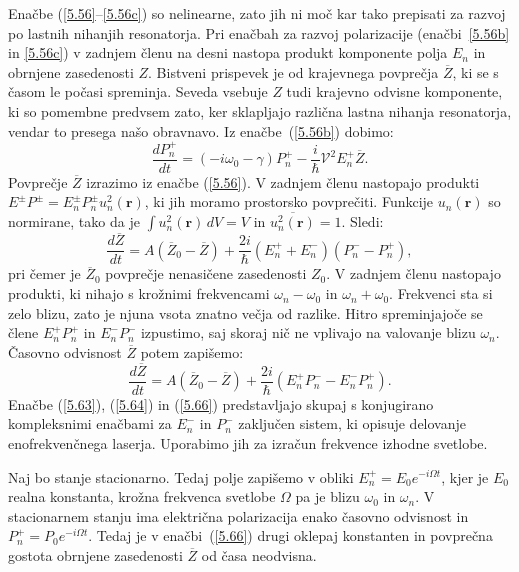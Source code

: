 Enačbe (\ref{5.56}--\ref{5.56c}) so nelinearne, zato jih ni moč kar tako
prepisati za razvoj po lastnih nihanjih resonatorja. Pri enačbah za
razvoj polarizacije (enačbi~\ref{5.56b} in \ref{5.56c}) v zadnjem členu na desni 
nastopa produkt komponente polja $E_n$ in obrnjene zasedenosti $Z$. Bistveni
prispevek je od krajevnega povprečja $\overline{Z}$, ki se s časom le počasi spreminja.
Seveda vsebuje $Z$ tudi krajevno odvisne komponente, ki so pomembne 
predvsem zato, ker sklapljajo različna lastna nihanja resonatorja, vendar to
presega našo obravnavo. Iz enačbe~(\ref{5.56b}) dobimo:
\begin{equation}  
\label{5.64}
\frac{d P_n^+}{dt}=\left(-i \omega_0-\gamma\right)P_n^{+}-\frac{i}{\hslash}
\mathcal{V}^2 E_n^+ \overline{Z}.
\end{equation}
Povprečje $\overline{Z}$ izrazimo iz enačbe (\ref{5.56}). V zadnjem členu nastopajo produkti 
$E^{\pm}P^{\pm}=E_n^{\pm}P_n^{\pm} u_n^2\left(\mathbf{r}\right)$,
ki jih moramo prostorsko povprečiti. Funkcije $u_n\left(\mathbf{r}\right)$ so
normirane, tako da je $\int u_n^2\left(\mathbf{r}\right) \,dV=V$ in $\overline{u_n^2\left(\mathbf{r}\right)}=1$.
Sledi:
\begin{equation}  
\label{5.65}
\frac{d\overline{Z}}{dt}= A\left(\overline{Z}_0-\overline{Z}\right)+ \frac{2i}{\hslash}\left(E_n^+
+E_n^-\right)\left(P_n^- - P_n^+\right)\!\!,
\end{equation}
pri čemer je $\overline{Z}_0$ povprečje nenasičene zasedenosti $Z_0$. V zadnjem
členu nastopajo produkti, ki nihajo s krožnimi frekvencami $\omega_n-
\omega_0$ in $\omega_n+ \omega_0$. Frekvenci sta si zelo blizu,
zato je njuna vsota znatno večja od razlike. Hitro spreminjajoče se člene 
$E_n^+P_n^+$ in $E_n^- P_n^-$ izpustimo, 
saj skoraj nič ne vplivajo na valovanje blizu $\omega_n$. Časovno odvisnost 
$\overline{Z}$ potem zapišemo:  
\begin{equation}  
\label{5.66}
\frac{d\overline{Z}}{dt}= A\left(\overline{Z}_0-\overline{Z}\right)+\frac{2i}{\hslash}\left(E_n^+
P_n^- - E_n^- P_n^+\right)\!\!.
\end{equation}
Enačbe (\ref{5.63}), (\ref{5.64}) in (\ref{5.66}) predstavljajo skupaj s konjugirano
kompleksnimi enačbami za $E_n^-$ in $P_n^-$ zaključen
sistem, ki opisuje delovanje enofrekvenčnega laserja. Uporabimo jih za
izračun frekvence izhodne svetlobe.

Naj bo stanje stacionarno. Tedaj polje zapišemo v obliki $E_{n
}^{+}=E_{0}e^{-i\Omega t}$, kjer je $E_{0}$ realna konstanta, krožna frekvenca
svetlobe $\Omega$ pa je blizu $\omega _{0}$ in $\omega _{n }$. V
stacionarnem stanju ima električna polarizacija enako časovno odvisnost in 
$P_{n }^{+}=P_{0}e^{-i\Omega t}$. Tedaj je v enačbi~(\ref{5.66}) drugi
oklepaj konstanten in povprečna gostota obrnjene zasedenosti $\overline{Z}$ 
od časa neodvisna. 


